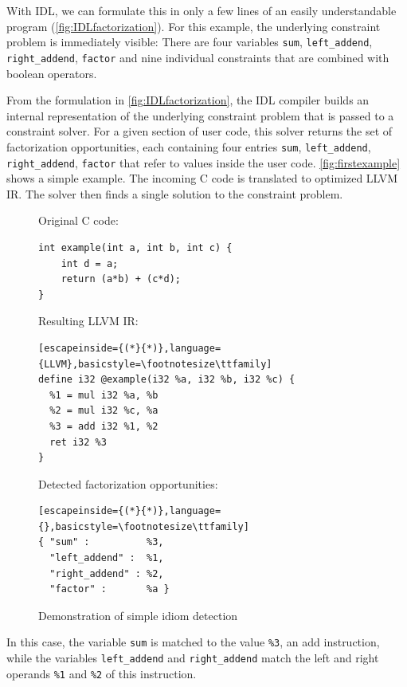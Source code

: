     With IDL, we can formulate this in only a few lines of an easily
    understandable program (\autoref{fig:IDLfactorization}).
    For this example, the underlying constraint problem is immediately visible:
    There are four variables \texttt{sum}, \texttt{left\_addend},
    \texttt{right\_addend}, \texttt{factor} and nine individual constraints
    that are combined with boolean operators.

    From the formulation in \autoref{fig:IDLfactorization}, the IDL compiler
    builds an internal representation of the underlying constraint problem that
    is passed to a constraint solver.
    For a given section of user code, this solver returns the set of
    factorization opportunities, each containing four entries
    \texttt{sum}, \texttt{left\_addend}, \texttt{right\_addend}, \texttt{factor}
    that refer to values inside the user code.
    \autoref{fig:firstexample} shows a simple example.
    The incoming C code is translated to optimized LLVM IR.
    The solver then finds a single solution to the constraint problem.

\begin{figure}[h]
Original C code:
\begin{lstlisting}[basicstyle=\footnotesize\ttfamily]
int example(int a, int b, int c) {
    int d = a;
    return (a*b) + (c*d);
}
\end{lstlisting}
\vspace{1em}
Resulting LLVM IR:
\begin{lstlisting}[escapeinside={(*}{*)},language={LLVM},basicstyle=\footnotesize\ttfamily]
define i32 @example(i32 %a, i32 %b, i32 %c) {
  %1 = mul i32 %a, %b
  %2 = mul i32 %c, %a
  %3 = add i32 %1, %2
  ret i32 %3
}
\end{lstlisting}
\vspace{1em}
Detected factorization opportunities:
\begin{lstlisting}[escapeinside={(*}{*)},language={},basicstyle=\footnotesize\ttfamily]
{ "sum" :          %3,
  "left_addend" :  %1,
  "right_addend" : %2,
  "factor" :       %a }
\end{lstlisting}
\vspace{-0.3cm}
\caption{Demonstration of simple idiom detection}
\label{fig:firstexample}
\end{figure}

In this case, the variable {\tt sum} is matched to the value {\tt \%3}, an add instruction, while the variables {\tt left\_addend} and {\tt right\_addend} match the left and right operands {\tt \%1} and {\tt \%2} of this instruction. 

